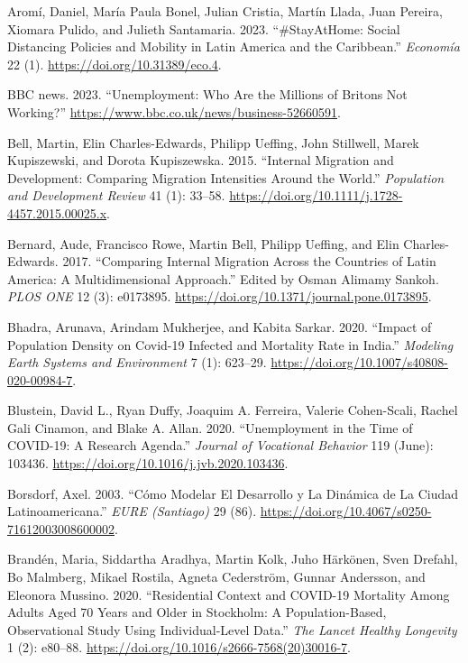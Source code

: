 \documentclass[11pt,letterpaper]{article}
\newlength{\cslhangindent}
\newlength{\cslentryspacingunit} %
\newenvironment{CSLReferences}[2] %
 {%
  \setlength{\parindent}{0pt}
  \ifodd #1
  \let\oldpar\par
  \def\par{\hangindent=\cslhangindent\oldpar}
  \fi
  \setlength{\parskip}{#2\cslentryspacingunit}
 }%
 {}
\begin{document}
\label{refs}
\begin{CSLReferences}{1}{0}
Aromí, Daniel, María Paula Bonel, Julian Cristia, Martín Llada, Juan
Pereira, Xiomara Pulido, and Julieth Santamaria. 2023. {``\#StayAtHome:
Social Distancing Policies and Mobility in Latin America and the
Caribbean.''} \emph{Economía} 22 (1).
\url{https://doi.org/10.31389/eco.4}.

BBC news. 2023. {``Unemployment: Who Are the Millions of Britons Not
Working?''} \url{https://www.bbc.co.uk/news/business-52660591}.

Bell, Martin, Elin Charles-Edwards, Philipp Ueffing, John Stillwell,
Marek Kupiszewski, and Dorota Kupiszewska. 2015. {``Internal Migration
and Development: Comparing Migration Intensities Around the World.''}
\emph{Population and Development Review} 41 (1): 33--58.
\url{https://doi.org/10.1111/j.1728-4457.2015.00025.x}.

Bernard, Aude, Francisco Rowe, Martin Bell, Philipp Ueffing, and Elin
Charles-Edwards. 2017. {``Comparing Internal Migration Across the
Countries of Latin America: A Multidimensional Approach.''} Edited by
Osman Alimamy Sankoh. \emph{PLOS ONE} 12 (3): e0173895.
\url{https://doi.org/10.1371/journal.pone.0173895}.

Bhadra, Arunava, Arindam Mukherjee, and Kabita Sarkar. 2020. {``Impact
of Population Density on Covid-19 Infected and Mortality Rate in
India.''} \emph{Modeling Earth Systems and Environment} 7 (1): 623--29.
\url{https://doi.org/10.1007/s40808-020-00984-7}.

Blustein, David L., Ryan Duffy, Joaquim A. Ferreira, Valerie
Cohen-Scali, Rachel Gali Cinamon, and Blake A. Allan. 2020.
{``Unemployment in the Time of COVID-19: A Research Agenda.''}
\emph{Journal of Vocational Behavior} 119 (June): 103436.
\url{https://doi.org/10.1016/j.jvb.2020.103436}.

Borsdorf, Axel. 2003. {``Cómo Modelar El Desarrollo y La Dinámica de La
Ciudad Latinoamericana.''} \emph{EURE (Santiago)} 29 (86).
\url{https://doi.org/10.4067/s0250-71612003008600002}.

Brandén, Maria, Siddartha Aradhya, Martin Kolk, Juho Härkönen, Sven
Drefahl, Bo Malmberg, Mikael Rostila, Agneta Cederström, Gunnar
Andersson, and Eleonora Mussino. 2020. {``Residential Context and
COVID-19 Mortality Among Adults Aged 70 Years and Older in Stockholm: A
Population-Based, Observational Study Using Individual-Level Data.''}
\emph{The Lancet Healthy Longevity} 1 (2): e80--88.
\url{https://doi.org/10.1016/s2666-7568(20)30016-7}.


\end{CSLReferences}
\end{document}
